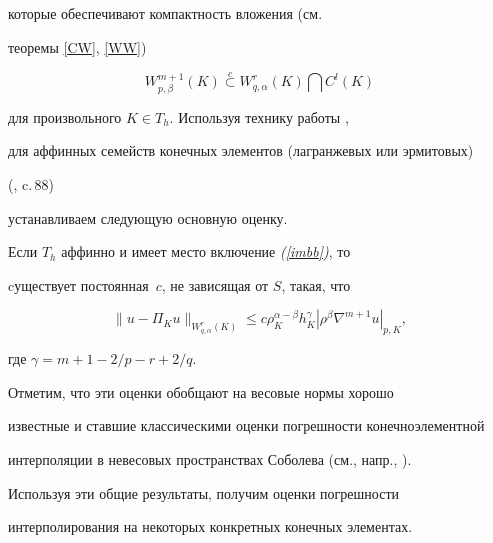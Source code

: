 которые обеспечивают компактность вложения (см.


теоремы \ref{CW}, \ref{WW}) 


$$


W_{p,\beta}^{m+1}(K) \overset{c}{\subset}{} W_{q,\alpha}^r(K)\bigcap C^l(K)


$$


для произвольного $K \in T_h$. Используя технику работы \cite{Timer92},


для аффинных семейств конечных элементов (лагранжевых или эрмитовых)


(\cite{Ciarle}, c.\,88) 


устанавливаем следующую основную оценку.





\begin{thm} \label{Est_Main_Elem}


Если $T_h$ аффинно и имеет место включение {\em (\ref{imbb})}, то 


cуществует постоянная~$c$, не зависящая от $S$, такая, что




$$


\| {u-\Pi_K u} \|_{W_{q,\alpha }^r( K )} 


\le c\rho _K^{\alpha -\beta }h_K^\gamma |


{\rho ^\beta \nabla ^{m+1}u} |_{p,K},




$$


где $\gamma=m+1-2/p-r+2/q$.


\end{thm}





Отметим, что эти оценки обобщают на весовые нормы хорошо 


известные и ставшие классическими оценки погрешности конечноэлементной 


интерполяции в невесовых пространствах Соболева (см., напр., \cite{Ciarle}).





Используя эти общие результаты, получим оценки погрешности 


интерполирования на некоторых конкретных конечных элементах.





